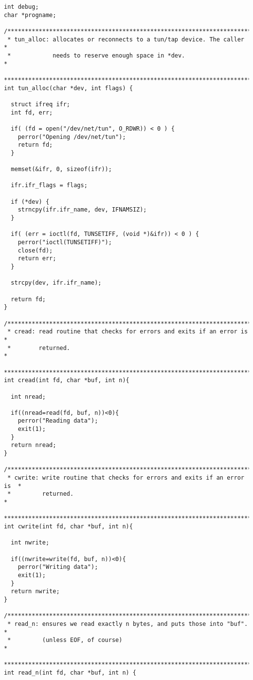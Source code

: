 \documentclass[a4paper,12pt]{article}
\begin{document}
\begin{verbatim}
int debug;
char *progname;

/**************************************************************************
 * tun_alloc: allocates or reconnects to a tun/tap device. The caller     *
 *            needs to reserve enough space in *dev.                      *
 **************************************************************************/
int tun_alloc(char *dev, int flags) {

  struct ifreq ifr;
  int fd, err;

  if( (fd = open("/dev/net/tun", O_RDWR)) < 0 ) {
    perror("Opening /dev/net/tun");
    return fd;
  }

  memset(&ifr, 0, sizeof(ifr));

  ifr.ifr_flags = flags;

  if (*dev) {
    strncpy(ifr.ifr_name, dev, IFNAMSIZ);
  }

  if( (err = ioctl(fd, TUNSETIFF, (void *)&ifr)) < 0 ) {
    perror("ioctl(TUNSETIFF)");
    close(fd);
    return err;
  }

  strcpy(dev, ifr.ifr_name);

  return fd;
}

/**************************************************************************
 * cread: read routine that checks for errors and exits if an error is    *
 *        returned.                                                       *
 **************************************************************************/
int cread(int fd, char *buf, int n){
  
  int nread;

  if((nread=read(fd, buf, n))<0){
    perror("Reading data");
    exit(1);
  }
  return nread;
}

/**************************************************************************
 * cwrite: write routine that checks for errors and exits if an error is  *
 *         returned.                                                      *
 **************************************************************************/
int cwrite(int fd, char *buf, int n){
  
  int nwrite;

  if((nwrite=write(fd, buf, n))<0){
    perror("Writing data");
    exit(1);
  }
  return nwrite;
}

/**************************************************************************
 * read_n: ensures we read exactly n bytes, and puts those into "buf".    *
 *         (unless EOF, of course)                                        *
 **************************************************************************/
int read_n(int fd, char *buf, int n) {


\end{verbatim}
\end{document}
